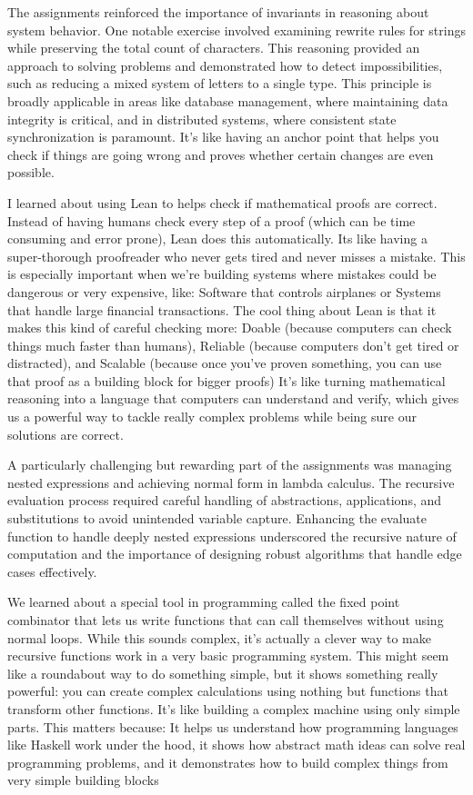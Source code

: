 \documentclass{article}
\theoremstyle{theorem}
\theoremstyle{definition}
\theoremstyle{remark}
\begin{document}
The assignments reinforced the importance of invariants in reasoning about system behavior. One notable 
exercise involved examining rewrite rules for strings while preserving the total count of characters. 
This reasoning provided an approach to solving problems and demonstrated how to detect impossibilities, 
such as reducing a mixed system of letters to a single type. This principle is broadly applicable in 
areas like database management, where maintaining data integrity is critical, and in distributed systems,
where consistent state synchronization is paramount. It's like having an anchor point that helps you check 
if things are going wrong and proves whether certain changes are even possible.

I learned about using Lean to helps check if mathematical proofs are correct. 
Instead of having humans check every step of a proof (which can be time consuming and error prone), 
Lean does this automatically. Its like having a super-thorough proofreader who never gets tired and 
never misses a mistake. This is especially important when we're building systems where mistakes could be 
dangerous or very expensive, like: Software that controls airplanes or Systems that handle large financial transactions.
The cool thing about Lean is that it makes this kind of careful checking more: Doable (because computers can check 
things much faster than humans), Reliable (because computers don't get tired or distracted), and Scalable (because once 
you've proven something, you can use that proof as a building block for bigger proofs) It's like turning mathematical 
reasoning into a language that computers can understand and verify, which gives us a powerful way to tackle really 
complex problems while being sure our solutions are correct.


A particularly challenging but rewarding part of the assignments was managing nested expressions and achieving 
normal form in lambda calculus. The recursive evaluation process required careful handling of abstractions, 
applications, and substitutions to avoid unintended variable capture. Enhancing the evaluate function to 
handle deeply nested expressions underscored the recursive nature of computation and the importance of 
designing robust algorithms that handle edge cases effectively.

We learned about a special tool in programming called the fixed point combinator that lets us write functions that 
can call themselves without using normal loops. While this sounds complex, it's actually a clever way to make recursive 
functions work in a very basic programming system. This might seem like a roundabout way to do something simple, but it 
shows something really powerful: you can create complex calculations using nothing but functions that transform other 
functions. It's like building a complex machine using only simple parts. This matters because: It helps us understand how 
programming languages like Haskell work under the hood, it shows how abstract math ideas can solve real programming problems, and
it demonstrates how to build complex things from very simple building blocks
\end{document}
